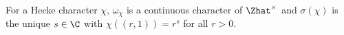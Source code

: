 For a Hecke character $\chi$, $\omega_\chi$ is a continuous character of $\Zhat^\times$ and $\sigma(\chi)$ is the unique $s\in\C$ with $\chi((r,1))=r^s$ for all $r>0$.
